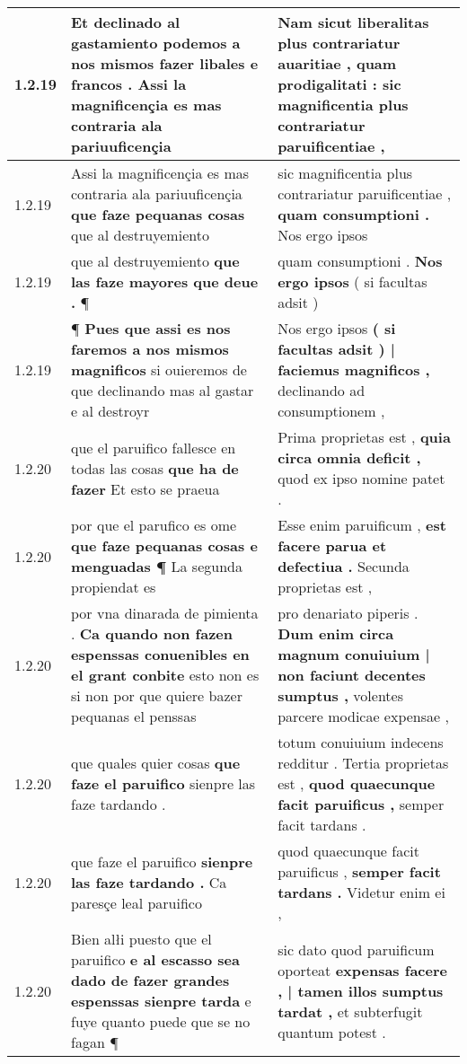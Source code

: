 \begin{tabular}{|p{1cm}|p{6.5cm}|p{6.5cm}|}
1.2.19 & Et declinado al gastamiento \textbf{ podemos a nos mismos fazer libales e francos . } Assi la magnificençia es mas contraria ala pariuuficençia & Nam sicut liberalitas plus contrariatur auaritiae , \textbf{ quam prodigalitati : } sic magnificentia plus contrariatur paruificentiae , \\\hline
1.2.19 & Assi la magnificençia es mas contraria ala pariuuficençia \textbf{ que faze pequanas cosas } que al destruyemiento & sic magnificentia plus contrariatur paruificentiae , \textbf{ quam consumptioni . } Nos ergo ipsos \\\hline
1.2.19 & que al destruyemiento \textbf{ que las faze mayores que deue . } ¶ & quam consumptioni . \textbf{ Nos ergo ipsos } ( si facultas adsit ) \\\hline
1.2.19 & ¶ \textbf{ Pues que assi es nos faremos a nos mismos magnificos } si ouieremos de que declinando mas al gastar e al destroyr & Nos ergo ipsos \textbf{ ( si facultas adsit ) | faciemus magnificos , } declinando ad consumptionem , \\\hline
1.2.20 & que el paruifico fallesce en todas las cosas \textbf{ que ha de fazer } Et esto se praeua & Prima proprietas est , \textbf{ quia circa omnia deficit , } quod ex ipso nomine patet . \\\hline
1.2.20 & por que el parufico es ome \textbf{ que faze pequanas cosas e menguadas ¶ } La segunda propiendat es & Esse enim paruificum , \textbf{ est facere parua et defectiua . } Secunda proprietas est , \\\hline
1.2.20 & por vna dinarada de pimienta . \textbf{ Ca quando non fazen espenssas conuenibles en el grant conbite } esto non es si non por que quiere bazer pequanas el penssas & pro denariato piperis . \textbf{ Dum enim circa magnum conuiuium | non faciunt decentes sumptus , } volentes parcere modicae expensae , \\\hline
1.2.20 & que quales quier cosas \textbf{ que faze el paruifico } sienpre las faze tardando . & totum conuiuium indecens redditur . Tertia proprietas est , \textbf{ quod quaecunque facit paruificus , } semper facit tardans . \\\hline
1.2.20 & que faze el paruifico \textbf{ sienpre las faze tardando . } Ca paresçe leal paruifico & quod quaecunque facit paruificus , \textbf{ semper facit tardans . } Videtur enim ei , \\\hline
1.2.20 & Bien alłi puesto que el paruifico \textbf{ e al escasso sea dado de fazer grandes espenssas sienpre tarda } e fuye quanto puede que se no fagan ¶ & sic dato quod paruificum oporteat \textbf{ expensas facere , | tamen illos sumptus tardat , } et subterfugit quantum potest . \\\hline

\end{tabular}
